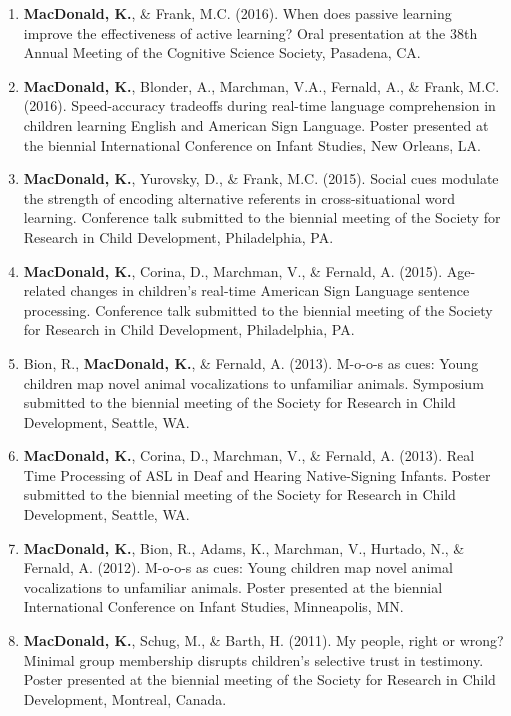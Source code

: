 \documentclass[10pt]{article}
\makeatletter
\newlength{\bibhang}
\newlength{\bibsep}
 {\@listi \global\bibsep\itemsep \global\advance\bibsep by\parsep}
\newenvironment{bibsection}%
        {\begin{enumerate}{}{%
       \setlength{\leftmargin}{\bibhang}%
       \setlength{\itemindent}{-\leftmargin}%
       \setlength{\itemsep}{\bibsep}%
       \setlength{\parsep}{\z@}%
        \setlength{\partopsep}{0pt}%
        \setlength{\topsep}{0pt}}}
        {\end{enumerate}\vspace{-.6\baselineskip}}
\makeatother
\begin{document}
\begin{bibsection}
\item {\bf MacDonald, K.}, \& Frank, M.C. (2016). When does passive learning improve the effectiveness of active learning? Oral presentation at the 38th Annual Meeting of the Cognitive Science Society, Pasadena, CA.

\item {\bf MacDonald, K.}, Blonder, A., Marchman, V.A., Fernald, A., \& Frank, M.C. (2016). Speed-accuracy tradeoffs during real-time language comprehension in children learning English and American Sign Language. Poster presented at the biennial International Conference on Infant Studies, New Orleans, LA.

\item {\bf MacDonald, K.}, Yurovsky, D., \& Frank, M.C. (2015). Social cues modulate the strength of encoding alternative referents in cross-situational word learning. Conference talk submitted to the biennial meeting of the Society for Research in Child Development, Philadelphia, PA.

\item {\bf MacDonald, K.}, Corina, D., Marchman, V., \& Fernald, A. (2015). Age-related changes in children's real-time American Sign Language sentence processing. Conference talk submitted to the biennial meeting of the Society for Research in Child Development, Philadelphia, PA.

\item Bion, R., {\bf MacDonald, K.}, \& Fernald, A. (2013). M-o-o-s as cues: Young children map novel animal vocalizations to unfamiliar animals. Symposium submitted to the biennial meeting of the Society for Research in Child Development, Seattle, WA.

\item {\bf MacDonald, K.}, Corina, D., Marchman, V., \& Fernald, A. (2013). Real Time Processing of ASL in Deaf and Hearing Native-Signing Infants. Poster submitted to the biennial meeting of the Society for Research in Child Development, Seattle, WA.

\item {\bf MacDonald, K.}, Bion, R., Adams, K., Marchman, V., Hurtado, N., \& Fernald, A. (2012). M-o-o-s as cues: Young children map novel animal vocalizations to unfamiliar animals. Poster presented at the biennial International Conference on Infant Studies, Minneapolis, MN.

\item {\bf MacDonald, K.}, Schug, M., \& Barth, H. (2011). My people, right or wrong? Minimal group membership disrupts children's selective trust in testimony. Poster presented at the biennial meeting of the Society for Research in Child Development, Montreal, Canada.


\end{bibsection}
\end{document}
